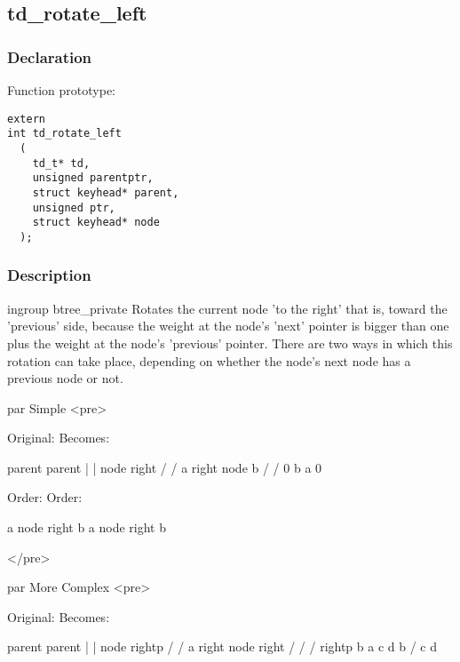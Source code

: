 
\newpage
\subsection{td\_rotate\_left}
\subsubsection{Declaration} Function prototype:

\begin{verbatim}
extern
int td_rotate_left
  (
    td_t* td,
    unsigned parentptr,
    struct keyhead* parent,
    unsigned ptr,
    struct keyhead* node
  );
\end{verbatim}

\subsubsection{Description}


 ingroup btree\_private
 Rotates the current node 'to the right' that is, toward the 'previous'
 side, because the weight at the node's 'next' pointer is bigger than
 one plus the weight at the node's 'previous' pointer.
 There are two ways in which this rotation can take place, depending
 on whether the node's next node has a previous node or not.
 
par Simple
<pre>

             Original:                       Becomes:

             parent                          parent
               |                               |
              node                           right
              /                             /   
             a    right                    node   b
                  /                       /  
                 0     b                  a    0

             Order:                          Order:

         a node right b                   a node right b

</pre>

par More Complex
<pre>

             Original:                       Becomes:

             parent                          parent
               |                               |
              node                           rightp
              /                             /   
             a    right                    node   right
                  /                       /      /  
               rightp  b                  a    c  d    b
               /   
              c     d

